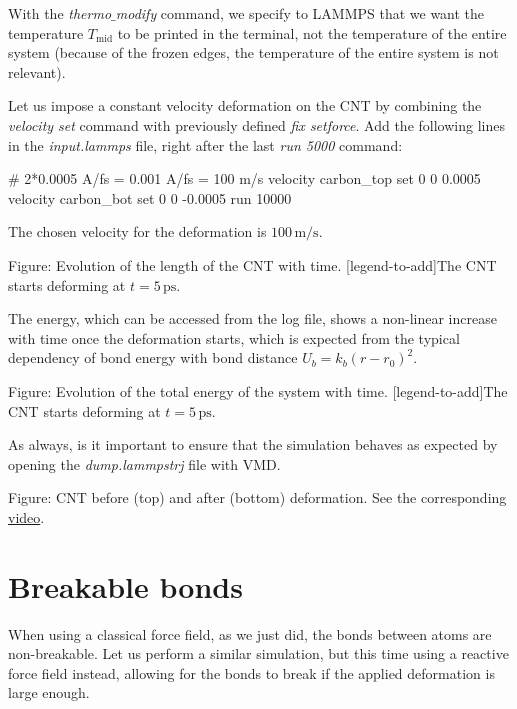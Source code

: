 \noindent With the \textit{thermo$\_$modify} command, we specify to LAMMPS that we
want the temperature $T_\mathrm{mid}$ to be printed in
the terminal, not the temperature of the entire system
(because of the frozen edges, the temperature of
the entire system is not relevant).

\vspace{0.25cm} \noindent Let us impose a constant velocity deformation on the CNT by combining
the \textit{velocity set} command with previously defined \textit{fix setforce}. 
Add the following lines in the \textit{input.lammps} file, 
right after the last \textit{run 5000} command:

\begin{lcverbatim}
# 2*0.0005 A/fs = 0.001 A/fs = 100 m/s
velocity carbon_top set 0 0 0.0005
velocity carbon_bot set 0 0 -0.0005
run 10000
\end{lcverbatim}

\noindent The chosen velocity for the deformation is $100\,\text{m/s}$.

\vspace{0.25cm} Figure: Evolution of the length of the CNT with time.
[legend-to-add]The CNT starts deforming at $t = 5\,\text{ps}$.

\vspace{0.25cm} \noindent The energy, which can be accessed from the log file, shows a non-linear
increase with time once the deformation starts,
which is expected from the typical dependency of bond energy with
bond distance $U_b = k_b \left( r - r_0 \right)^2$.

\vspace{0.25cm} Figure: Evolution of the total energy of the system with time.
[legend-to-add]The CNT starts deforming at $t = 5\,\text{ps}$.

\vspace{0.25cm} \noindent As always, is it important to ensure that the simulation
behaves as expected by opening the \textit{dump.lammpstrj} file with VMD.

\vspace{0.25cm} Figure: CNT before (top) and after (bottom) deformation. See the corresponding \href{https://youtu.be/S05nzreQR18}{video}.

\section{Breakable bonds}
\noindent When using a classical force field, as we just did, the bonds between atoms 
are non-breakable. Let us perform a similar simulation, 
but this time using a reactive force field instead, allowing for the bonds to break
if the applied deformation is large enough.

